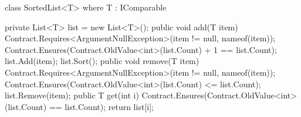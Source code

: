 class SortedList<T> where T : IComparable
{
  private List<T> list = new List<T>();
  public void add(T item)
  {
    Contract.Requires<ArgumentNullException>(item != null, nameof(item));
    Contract.Ensures(Contract.OldValue<int>(list.Count) + 1 == list.Count);
    list.Add(item);
    list.Sort();
  }
  public void remove(T item)
  {
    Contract.Requires<ArgumentNullException>(item != null, nameof(item));
    Contract.Ensures(Contract.OldValue<int>(list.Count) <= list.Count);
    list.Remove(item);
  }
  public T get(int i)
  {
    Contract.Ensures(Contract.OldValue<int>(list.Count) == list.Count);
    return list[i];
  }
 
}